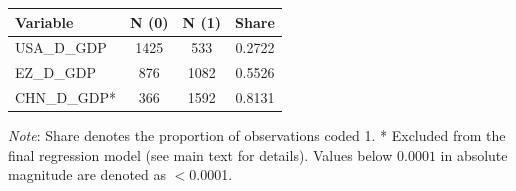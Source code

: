 \begin{tabular}{lccc}
  \toprule
  \textbf{Variable} & \textbf{N (0)} & \textbf{N (1)} & \textbf{Share} \\ 
  \midrule
  USA\_D\_GDP & 1425 & 533 & 0.2722 \\ 
  EZ\_D\_GDP & 876 & 1082 & 0.5526 \\ 
  CHN\_D\_GDP* & 366 & 1592 & 0.8131 \\ 
  \bottomrule
\end{tabular}
\par\vspace{4pt}
\begin{minipage}{\linewidth}
  \footnotesize \textit{Note}: Share denotes the proportion of observations coded 1. * Excluded from the final regression model (see main text for details). Values below $0.0001$ in absolute magnitude are denoted as $<$0.0001.
\end{minipage}